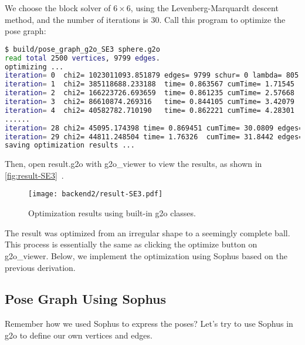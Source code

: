 We choose the block solver of $6\times6$, using the Levenberg-Marquardt descent method, and the number of iterations is 30. Call this program to optimize the pose graph:
\begin{lstlisting}[language=sh, caption=Terminal input:]
$ build/pose_graph_g2o_SE3 sphere.g2o 
read total 2500 vertices, 9799 edges.
optimizing ...
iteration= 0  chi2= 1023011093.851879 edges= 9799 schur= 0 lambda= 805.622433 levenbergIter= 1
iteration= 1  chi2= 385118688.233188  time= 0.863567 cumTime= 1.71545  edges= 9799 schur= 0 lambda= 537.081622 levenbergIter= 1
iteration= 2  chi2= 166223726.693659  time= 0.861235 cumTime= 2.57668  edges= 9799 schur= 0 lambda= 358.054415 levenbergIter= 1
iteration= 3  chi2= 86610874.269316   time= 0.844105 cumTime= 3.42079  edges= 9799 schur= 0 lambda= 238.702943 levenbergIter= 1
iteration= 4  chi2= 40582782.710190   time= 0.862221 cumTime= 4.28301  edges= 9799 schur= 0 lambda= 159.135295 levenbergIter= 1
......
iteration= 28 chi2= 45095.174398 time= 0.869451 cumTime= 30.0809 edges= 9799 schur= 0 lambda= 0.003127 levenbergIter= 1
iteration= 29 chi2= 44811.248504 time= 1.76326  cumTime= 31.8442 edges= 9799 schur= 0 lambda= 0.003785 levenbergIter= 2
saving optimization results ...
\end{lstlisting}

Then, open result.g2o with g2o\_viewer to view the results, as shown in \autoref{fig:result-SE3}~.
\begin{figure}[!ht]
	\centering
	\texttt{[image: backend2/result-SE3.pdf]}
	\caption{Optimization results using built-in g2o classes.}
	\label{fig:result-SE3}
\end{figure}

The result was optimized from an irregular shape to a seemingly complete ball. This process is essentially the same as clicking the optimize button on g2o\_viewer. Below, we implement the optimization using Sophus based on the previous derivation.

\subsection{Pose Graph Using Sophus}
Remember how we used Sophus to express the poses? Let's try to use Sophus in g2o to define our own vertices and edges.

